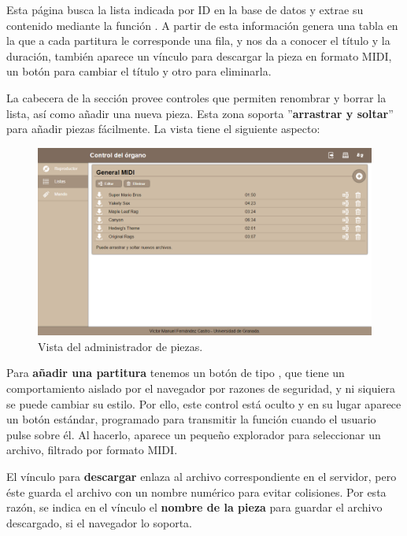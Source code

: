 Esta página busca la lista indicada por ID en la base de datos y extrae su contenido mediante la función . A partir de esta información genera una tabla en la que a cada partitura le corresponde una fila, y nos da a conocer el título y la duración, también aparece un vínculo para descargar la pieza en formato \acrshort{MIDI}, un botón para cambiar el título y otro para eliminarla. 

La cabecera de la sección provee controles que permiten renombrar y borrar la lista, así como añadir una nueva pieza. Esta zona soporta ''\textbf{arrastrar y soltar}'' para añadir piezas fácilmente. La vista tiene el siguiente aspecto:

\smallskip

\begin{figure}[H]
	\noindent \begin{centering}
		\includegraphics[width=\linewidth*3/4]{capitulo5/cap_piezas}
		\par\end{centering}
	\smallskip
	\caption{\label{fig:cap_piezas} Vista del administrador de piezas.}
\end{figure} 

\smallskip

Para \textbf{añadir una partitura} tenemos un botón de tipo , que tiene un comportamiento aislado por el navegador por razones de seguridad, y ni siquiera se puede cambiar su estilo. Por ello, este control está oculto y en su lugar aparece un botón  estándar, programado para transmitir la función  cuando el usuario pulse sobre él. Al hacerlo, aparece un pequeño explorador para seleccionar un archivo, filtrado por formato \acrshort{MIDI}.

El vínculo para \textbf{descargar} enlaza al archivo correspondiente en el servidor, pero éste guarda el archivo con un nombre numérico para evitar colisiones. Por esta razón, se indica en el vínculo el \textbf{nombre de la pieza} para guardar el archivo descargado, si el navegador lo soporta.

